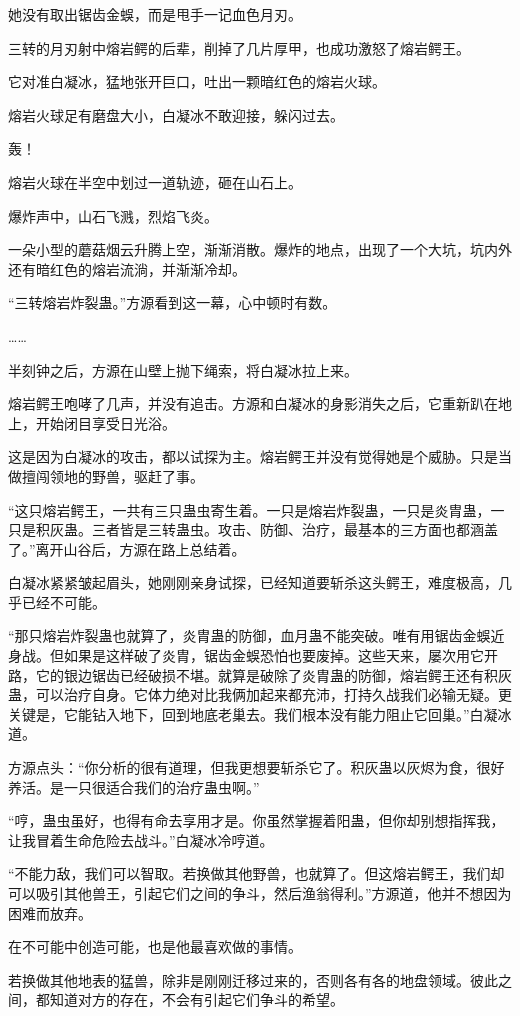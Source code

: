 \begin{this_body}
她没有取出锯齿金蜈，而是甩手一记血色月刃。

三转的月刃射中熔岩鳄的后辈，削掉了几片厚甲，也成功激怒了熔岩鳄王。

它对准白凝冰，猛地张开巨口，吐出一颗暗红色的熔岩火球。

熔岩火球足有磨盘大小，白凝冰不敢迎接，躲闪过去。

轰！

熔岩火球在半空中划过一道轨迹，砸在山石上。

爆炸声中，山石飞溅，烈焰飞炎。

一朵小型的蘑菇烟云升腾上空，渐渐消散。爆炸的地点，出现了一个大坑，坑内外还有暗红色的熔岩流淌，并渐渐冷却。

“三转熔岩炸裂蛊。”方源看到这一幕，心中顿时有数。

……

半刻钟之后，方源在山壁上抛下绳索，将白凝冰拉上来。

熔岩鳄王咆哮了几声，并没有追击。方源和白凝冰的身影消失之后，它重新趴在地上，开始闭目享受日光浴。

这是因为白凝冰的攻击，都以试探为主。熔岩鳄王并没有觉得她是个威胁。只是当做擅闯领地的野兽，驱赶了事。

“这只熔岩鳄王，一共有三只蛊虫寄生着。一只是熔岩炸裂蛊，一只是炎胄蛊，一只是积灰蛊。三者皆是三转蛊虫。攻击、防御、治疗，最基本的三方面也都涵盖了。”离开山谷后，方源在路上总结着。

白凝冰紧紧皱起眉头，她刚刚亲身试探，已经知道要斩杀这头鳄王，难度极高，几乎已经不可能。

“那只熔岩炸裂蛊也就算了，炎胄蛊的防御，血月蛊不能突破。唯有用锯齿金蜈近身战。但如果是这样破了炎胄，锯齿金蜈恐怕也要废掉。这些天来，屡次用它开路，它的银边锯齿已经破损不堪。就算是破除了炎胄蛊的防御，熔岩鳄王还有积灰蛊，可以治疗自身。它体力绝对比我俩加起来都充沛，打持久战我们必输无疑。更关键是，它能钻入地下，回到地底老巢去。我们根本没有能力阻止它回巢。”白凝冰道。

方源点头：“你分析的很有道理，但我更想要斩杀它了。积灰蛊以灰烬为食，很好养活。是一只很适合我们的治疗蛊虫啊。”

“哼，蛊虫虽好，也得有命去享用才是。你虽然掌握着阳蛊，但你却别想指挥我，让我冒着生命危险去战斗。”白凝冰冷哼道。

“不能力敌，我们可以智取。若换做其他野兽，也就算了。但这熔岩鳄王，我们却可以吸引其他兽王，引起它们之间的争斗，然后渔翁得利。”方源道，他并不想因为困难而放弃。

在不可能中创造可能，也是他最喜欢做的事情。

若换做其他地表的猛兽，除非是刚刚迁移过来的，否则各有各的地盘领域。彼此之间，都知道对方的存在，不会有引起它们争斗的希望。


\end{this_body}
